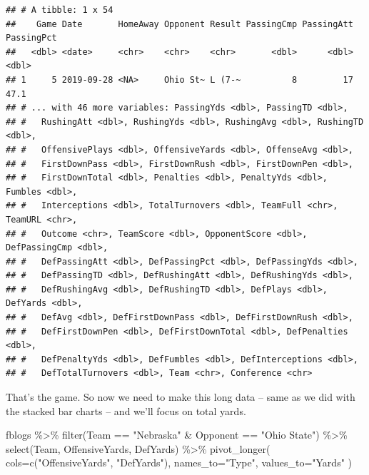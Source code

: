 \documentclass[
]{book}
\newenvironment{Shaded}{\begin{snugshade}}{\end{snugshade}}
\newcommand{\AttributeTok}[1]{\textcolor[rgb]{0.77,0.63,0.00}{#1}}
\newcommand{\FunctionTok}[1]{\textcolor[rgb]{0.00,0.00,0.00}{#1}}
\newcommand{\NormalTok}[1]{#1}
\newcommand{\SpecialCharTok}[1]{\textcolor[rgb]{0.00,0.00,0.00}{#1}}
\newcommand{\StringTok}[1]{\textcolor[rgb]{0.31,0.60,0.02}{#1}}
\begin{document}
\begin{verbatim}
## # A tibble: 1 x 54
##    Game Date       HomeAway Opponent Result PassingCmp PassingAtt PassingPct
##   <dbl> <date>     <chr>    <chr>    <chr>       <dbl>      <dbl>      <dbl>
## 1     5 2019-09-28 <NA>     Ohio St~ L (7-~          8         17       47.1
## # ... with 46 more variables: PassingYds <dbl>, PassingTD <dbl>,
## #   RushingAtt <dbl>, RushingYds <dbl>, RushingAvg <dbl>, RushingTD <dbl>,
## #   OffensivePlays <dbl>, OffensiveYards <dbl>, OffenseAvg <dbl>,
## #   FirstDownPass <dbl>, FirstDownRush <dbl>, FirstDownPen <dbl>,
## #   FirstDownTotal <dbl>, Penalties <dbl>, PenaltyYds <dbl>, Fumbles <dbl>,
## #   Interceptions <dbl>, TotalTurnovers <dbl>, TeamFull <chr>, TeamURL <chr>,
## #   Outcome <chr>, TeamScore <dbl>, OpponentScore <dbl>, DefPassingCmp <dbl>,
## #   DefPassingAtt <dbl>, DefPassingPct <dbl>, DefPassingYds <dbl>,
## #   DefPassingTD <dbl>, DefRushingAtt <dbl>, DefRushingYds <dbl>,
## #   DefRushingAvg <dbl>, DefRushingTD <dbl>, DefPlays <dbl>, DefYards <dbl>,
## #   DefAvg <dbl>, DefFirstDownPass <dbl>, DefFirstDownRush <dbl>,
## #   DefFirstDownPen <dbl>, DefFirstDownTotal <dbl>, DefPenalties <dbl>,
## #   DefPenaltyYds <dbl>, DefFumbles <dbl>, DefInterceptions <dbl>,
## #   DefTotalTurnovers <dbl>, Team <chr>, Conference <chr>
\end{verbatim}

That's the game. So now we need to make this long data -- same as we did with the stacked bar charts -- and we'll focus on total yards.

\begin{Shaded}
\begin{Highlighting}[]
\NormalTok{fblogs }\SpecialCharTok{\%\textgreater{}\%} 
        \FunctionTok{filter}\NormalTok{(Team }\SpecialCharTok{==} \StringTok{"Nebraska"} \SpecialCharTok{\&}\NormalTok{ Opponent }\SpecialCharTok{==} \StringTok{"Ohio State"}\NormalTok{) }\SpecialCharTok{\%\textgreater{}\%} 
        \FunctionTok{select}\NormalTok{(Team, OffensiveYards, DefYards) }\SpecialCharTok{\%\textgreater{}\%} 
        \FunctionTok{pivot\_longer}\NormalTok{(}
                \AttributeTok{cols=}\FunctionTok{c}\NormalTok{(}\StringTok{"OffensiveYards"}\NormalTok{, }\StringTok{"DefYards"}\NormalTok{), }
                \AttributeTok{names\_to=}\StringTok{"Type"}\NormalTok{, }
                \AttributeTok{values\_to=}\StringTok{"Yards"}
\NormalTok{                )}
\end{Highlighting}
\end{Shaded}
\end{document}
